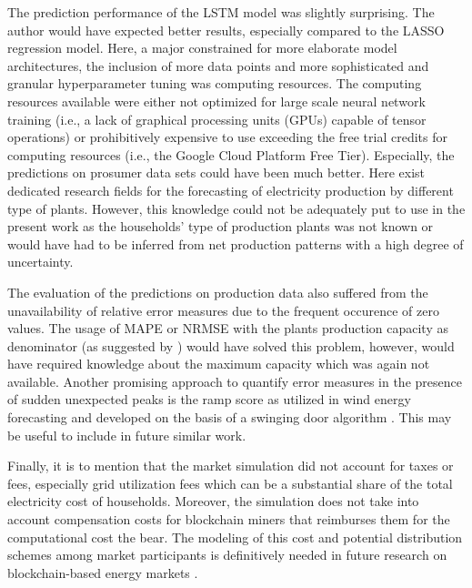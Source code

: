 The prediction performance of the LSTM model was slightly surprising. The author would have expected better results, especially compared to the LASSO regression model. Here, a major constrained for more elaborate model architectures, the inclusion of more data points and more sophisticated and granular hyperparameter tuning was computing resources. The computing resources available were either not optimized for large scale neural network training (i.e., a lack of graphical processing units (GPUs) capable of tensor operations) or prohibitively expensive to use exceeding the free trial credits for computing resources (i.e., the Google Cloud Platform Free Tier). Especially, the predictions on prosumer data sets could have been much better. Here exist dedicated research fields for the forecasting of electricity production by different type of plants. However, this knowledge could not be adequately put to use in the present work as the households' type of production plants was not known or would have had to be inferred from net production patterns with a high degree of uncertainty.

The evaluation of the predictions on production data also suffered from the unavailability of relative error measures due to the frequent occurence of zero values. The usage of MAPE or NRMSE with the plants production capacity as denominator (as suggested by \citet{Hoff:2013}) would have solved this problem, however, would have required knowledge about the maximum capacity which was again not available. Another promising approach to quantify error measures in the presence of sudden unexpected peaks is the ramp score as utilized in wind energy forecasting and developed on the basis of a swinging door algorithm \citep[e.g.,][]{Bianco:2016, Florita:2013}. This may be useful to include in future similar work.

Finally, it is to mention that the market simulation did not account for taxes or fees, especially grid utilization fees which can be a substantial share of the total electricity cost of households. Moreover, the simulation does not take into account compensation costs for blockchain miners that reimburses them for the computational cost the bear. The modeling of this cost and potential distribution schemes among market participants is definitively needed in future research on blockchain-based energy markets \citep{Mengelkamp:2018a}.




